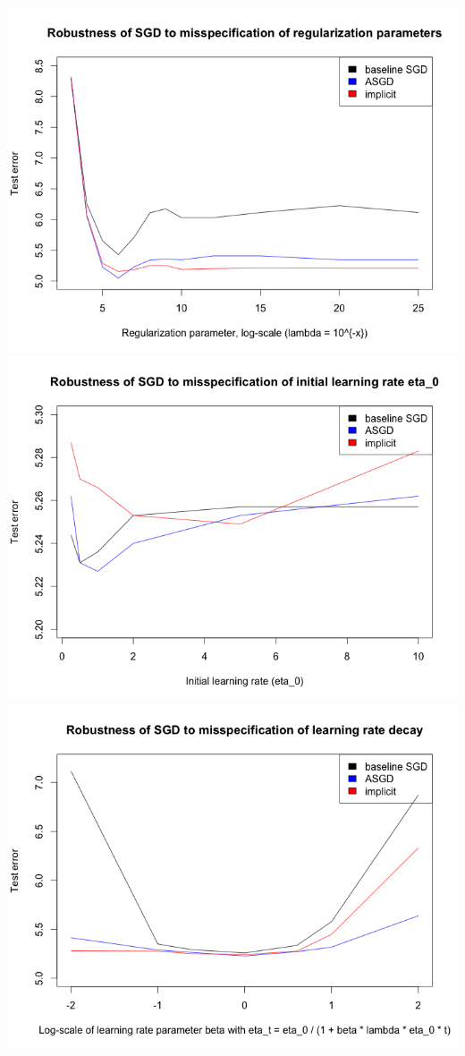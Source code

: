 \documentclass{article}
\begin{document}
\begin{center}
\includegraphics[width=140mm]{regularization_robustness.png}\\
\includegraphics[width=140mm]{eta0_robustness.png}
\includegraphics[width=140mm]{etat_robustness.png}
\end{center}
\end{document}
